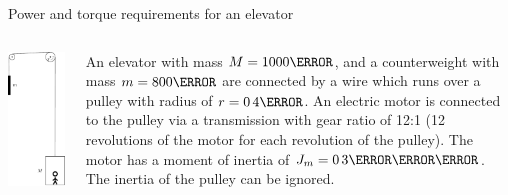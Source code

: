 \documentclass[presentation,aspectratio=169]{beamer}
\begin{document}
\begin{frame}[label={sec:org07221cf}]{Power and torque requirements for an elevator}
\begin{columns}
\begin{column}{0.38\columnwidth}
\begin{center}
\includegraphics[height=0.8\textheight]{../../figures/mech-elevator}
\end{center}
\end{column}

\begin{column}{0.72\columnwidth}
An elevator with mass \(M=\unit{1000}{\kilogram}\), and a counterweight with mass \(m=\unit{800}{\kilogram}\) are connected by a wire which runs over a pulley with radius of \(r=\unit{0.4}{\meter}\). An electric  motor is connected to the pulley via a transmission with gear ratio of 12:1 (12 revolutions of the motor for each revolution of the pulley). The motor has a moment of inertia of \(J_m = \unit{0.3}{\kilogram\meter\squared}\). The inertia of the pulley can be ignored.


\end{column}
\end{columns}
\end{frame}
\end{document}
